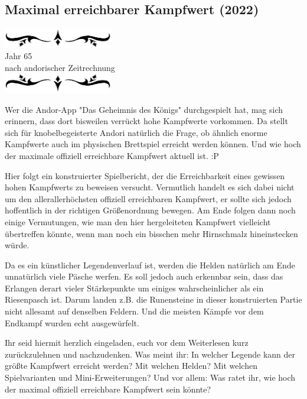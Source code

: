 \documentclass[10pt, a4paper, oneside]{book}
\newcommand{\az}[1]{%
    \begin{center}
        \includegraphics[width=180px]{Das Erbe des Wunderkindes/verzierung1.png}\\
        {\Huge #1} \\
        {nach andorischer Zeitrechnung}\\
        \includegraphics[width=180px]{Das Erbe des Wunderkindes/verzierung2.png}
    \end{center}
    \extramarks{}{#1 a.Z.}
}
\begin{document}
\begin{chapterbox}
    \chapter{Maximal erreichbarer Kampfwert (2022)}
    \az{Jahr 65}

    Wer die Andor-App "Das Geheimnis des Königs" durchgespielt hat, mag sich erinnern, dass dort bisweilen verrückt hohe Kampfwerte vorkommen. Da stellt sich für knobelbegeisterte Andori natürlich die Frage, ob ähnlich enorme Kampfwerte auch im physischen Brettspiel erreicht werden können. Und wie hoch der maximale offiziell erreichbare Kampfwert aktuell ist. :P

    Hier folgt ein konstruierter Spielbericht, der die Erreichbarkeit eines gewissen hohen Kampfwerts zu beweisen versucht. Vermutlich handelt es sich dabei nicht um den allerallerhöchsten offiziell erreichbaren Kampfwert, er sollte sich jedoch hoffentlich in der richtigen Größenordnung bewegen. Am Ende folgen dann noch einige Vermutungen, wie man den hier hergeleiteten Kampfwert vielleicht übertreffen könnte, wenn man noch ein bisschen mehr Hirnschmalz hineinstecken würde.

    Da es ein künstlicher Legendenverlauf ist, werden die Helden natürlich am Ende unnatürlich viele Päsche werfen. Es soll jedoch auch erkennbar sein, dass das Erlangen derart vieler Stärkepunkte um einiges wahrscheinlicher als ein Riesenpasch ist. Darum landen z.B. die Runensteine in dieser konstruierten Partie nicht allesamt auf denselben Feldern. Und die meisten Kämpfe vor dem Endkampf wurden echt ausgewürfelt.

    Ihr seid hiermit herzlich eingeladen, euch vor dem Weiterlesen kurz zurückzulehnen und nachzudenken.
    Was meint ihr: In welcher Legende kann der größte Kampfwert erreicht werden? Mit welchen Helden? Mit welchen Spielvarianten und Mini-Erweiterungen?
    Und vor allem: Was ratet ihr, wie hoch der maximal offiziell erreichbare Kampfwert sein könnte?
\end{chapterbox}
\end{document}
